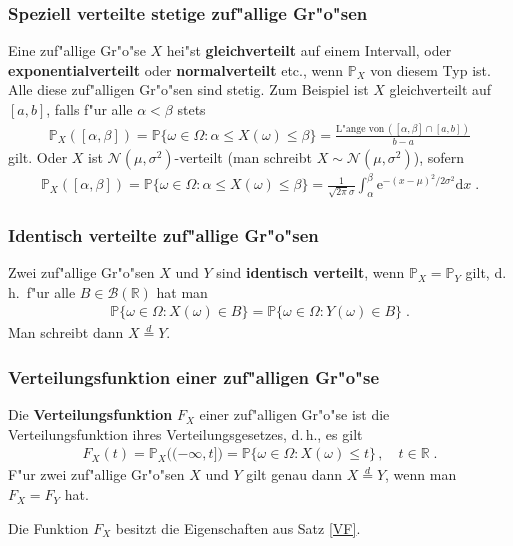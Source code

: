 \documentclass[ngerman,draft,parskip=half,twoside]{scrartcl}
\newcommand*{\R}{\mathbb{R}}      %
\newcommand*{\BorelM}{\mathcal{B}}  %
\newcommand*{\WKM}{\mathbb{P}}      %
\begin{document}
\subsubsection{Speziell verteilte stetige zuf"allige Gr"o"sen}
Eine zuf"allige Gr"o"se $X$ hei"st \textbf{gleichverteilt} auf einem Intervall,
oder \textbf{exponentialverteilt} oder \textbf{normalverteilt} etc., wenn $\WKM_X$ von diesem Typ
ist.
Alle diese zuf"alligen Gr"o"sen sind stetig.
Zum Beispiel ist $X$ gleichverteilt auf $[a,b]$, falls f"ur alle $\alpha<\beta$
stets
\begin{gather*}
  \WKM_X([\alpha,\beta])=\WKM\{\omega\in \Omega : \alpha\le X(\omega)\le \beta\}
     =\frac{\mbox{L"ange von}\, ([\alpha,\beta]\cap[a,b])}{b-a}
\end{gather*}
gilt. Oder $X$ ist $\mathcal N(\mu,\sigma^2)$-verteilt (man schreibt $X\sim \mathcal N(\mu,\sigma^2)$),
sofern
\begin{gather*}
  \WKM_X([\alpha,\beta])=\WKM\{\omega\in \Omega : \alpha\le X(\omega)\le \beta\}=
     \frac{1}{\sqrt{2\pi}\sigma}\int_\alpha^\beta \mathrm e^{-(x-\mu)^2/2\sigma^2}\mathrm d x\;.
\end{gather*}
\subsubsection{Identisch verteilte zuf"allige Gr"o"sen}
Zwei zuf"allige Gr"o"sen $X$ und $Y$ sind \textbf{identisch verteilt}, wenn $\WKM_X=\WKM_Y$ gilt,
d.\,h.~f"ur alle $B\in\BorelM(\R)$ hat man
\begin{gather*}
  \WKM\{\omega\in \Omega : X(\omega)\in B\}= \WKM\{\omega\in \Omega : Y(\omega)\in B\}\;.
\end{gather*}
Man schreibt dann $X\stackrel{d}{=}Y$.
\subsubsection{Verteilungsfunktion einer zuf"alligen Gr"o"se}
Die \textbf{Verteilungsfunktion} $F_X$ einer zuf"alligen Gr"o"se ist die Verteilungsfunktion
ihres Verteilungsgesetzes, d.\,h., es gilt
\begin{gather*}
  F_X(t)=\WKM_X\big((-\infty,t]\big)=\WKM\{\omega\in\Omega : X(\omega)\le t\}\,,\quad t\in \R\;.
\end{gather*}
F"ur zwei zuf"allige Gr"o"sen $X$ und $Y$ gilt genau dann $X\stackrel{d}{=}Y$, wenn man
$F_X=F_Y$ hat.

Die Funktion $F_X$ besitzt die Eigenschaften aus Satz \ref{VF}.
\end{document}
